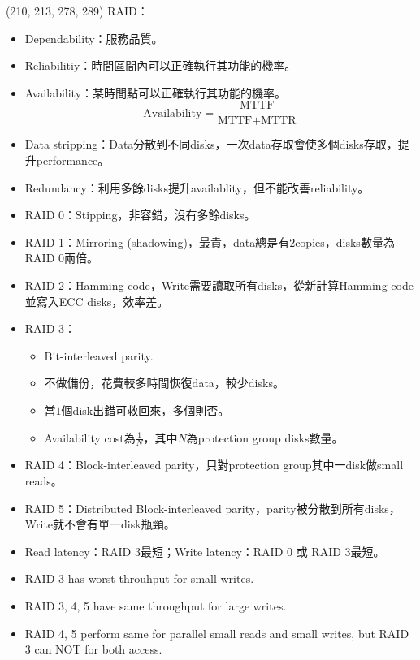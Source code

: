\item \begin{theorem}{(210, 213, 278, 289)} RAID：\begin{itemize}
        \item Dependability：服務品質。
        \item Reliabilitiy：時間區間內可以正確執行其功能的機率。
        \item Availability：某時間點可以正確執行其功能的機率。\begin{equation}
            \text{Availability} = \frac{\text{MTTF}}{\text{MTTF} + \text{MTTR}}
        \end{equation}
        \item Data stripping：Data分散到不同disks，一次data存取會使多個disks存取，提升performance。
        \item Redundancy：利用多餘disks提升availablity，但不能改善reliability。
        \item RAID 0：Stipping，非容錯，沒有多餘disks。
        \item RAID 1：Mirroring (shadowing)，最貴，data總是有$2$copies，disks數量為RAID 0兩倍。
        \item RAID 2：Hamming code，Write需要讀取所有disks，從新計算Hamming code並寫入ECC disks，效率差。
        \item RAID 3：\begin{itemize}
            \item Bit-interleaved parity.
            \item 不做備份，花費較多時間恢復data，較少disks。
            \item 當$1$個disk出錯可救回來，多個則否。
            \item Availability cost為$\frac{1}{N}$，其中$N$為protection group disks數量。
        \end{itemize}
        \item RAID 4：Block-interleaved parity，只對protection group其中一disk做small reads。
        \item RAID 5：Distributed Block-interleaved parity，parity被分散到所有disks，Write就不會有單一disk瓶頸。
        \item Read latency：RAID 3最短；Write latency：RAID 0 或 RAID 3最短。
        \item RAID 3 has worst throuhput for small writes.
        \item RAID 3, 4, 5 have same throughput for large writes.
        \item RAID 4, 5 perform same for parallel small reads and small writes, but RAID 3 can NOT for both access.
    \end{itemize}
\end{theorem}